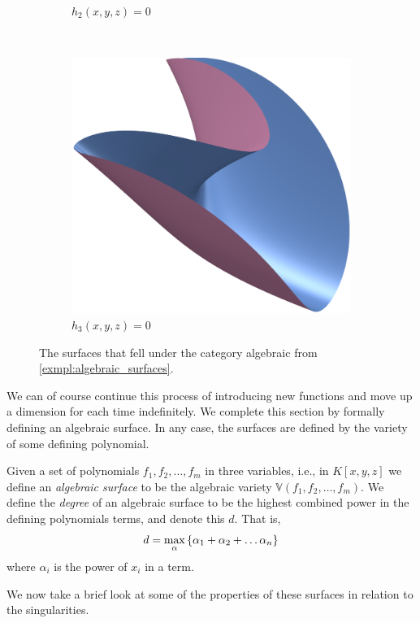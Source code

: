 \documentclass{article}
\newcommand{\V}{\ensuremath{\mathbb{V}}}
\begin{document}
\begin{example}
\begin{figure}[]
\begin{subfigure}[t]{0.3\textwidth}
                \caption{$h_2(x, y, z) = 0$}
            \end{subfigure}
            ~
            \begin{subfigure}[t]{0.3\textwidth}
                \includegraphics[height=0.6\textwidth]{pictures/example_three.png} 
                \caption{$h_3(x, y, z) = 0$}
            \end{subfigure}
            \caption{The surfaces that fell under the category algebraic from
            \cref{exmpl:algebraic_surfaces}.}
            \label{fig:algebraic_surfaces}
        \end{figure}
    \end{example}
    We can of course continue this process of introducing new functions and
    move up a dimension for each time indefinitely.  We complete this section
    by formally defining an algebraic surface. In any case, the surfaces are
    defined by the variety of some defining polynomial.
    \begin{definition}
        Given a set of polynomials $f_1, f_2, \ldots, f_m$ in three variables,
        i.e., in $K[x, y, z]$ we define an \emph{algebraic surface} to be the
        algebraic variety $\V(f_1, f_2, \ldots, f_m)$.  We define the
        \emph{degree} of an algebraic surface
        to be the highest combined power in the defining polynomials terms, and
        denote this $d$. That is,
        \begin{equation}
            \notag
            d = \max_{\alpha}\left\{ \alpha_1 + \alpha_2 + \ldots \alpha_n \right\}
        \end{equation}
        where $\alpha_i$ is the power of $x_i$ in a term.
    \end{definition}
    We now take a brief look at some of the properties of these surfaces in
    relation to the singularities.
    
\end{document}
